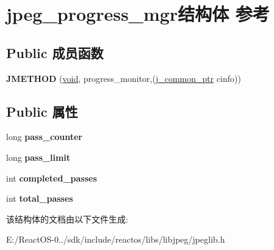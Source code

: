 \hypertarget{structjpeg__progress__mgr}{}\section{jpeg\+\_\+progress\+\_\+mgr结构体 参考}
\label{structjpeg__progress__mgr}
\subsection*{Public 成员函数}
\begin{DoxyCompactItemize}
\item 
\mbox{\label{structjpeg__progress__mgr_aa6fbc36158dd82f586d752f976ad7fa3}} 
{\bfseries J\+M\+E\+T\+H\+OD} (\hyperlink{interfacevoid}{void}, progress\+\_\+monitor,(\hyperlink{structjpeg__common__struct}{j\+\_\+common\+\_\+ptr} cinfo))
\end{DoxyCompactItemize}
\subsection*{Public 属性}
\begin{DoxyCompactItemize}
\item 
\mbox{\label{structjpeg__progress__mgr_ae52d1c89154d3f15ea44f96ee1c4ea7f}} 
long {\bfseries pass\+\_\+counter}
\item 
\mbox{\label{structjpeg__progress__mgr_a68ec6ba74838f7b2b8ded8d4c8254c1d}} 
long {\bfseries pass\+\_\+limit}
\item 
\mbox{\label{structjpeg__progress__mgr_a0cf4c1c84b2662763053e0eeaca417f3}} 
int {\bfseries completed\+\_\+passes}
\item 
\mbox{\label{structjpeg__progress__mgr_a35d61747861f284526a9b312b3dc59ca}} 
int {\bfseries total\+\_\+passes}
\end{DoxyCompactItemize}


该结构体的文档由以下文件生成\+:\begin{DoxyCompactItemize}
\item 
E\+:/\+React\+O\+S-\/0../sdk/include/reactos/libs/libjpeg/jpeglib.\+h\end{DoxyCompactItemize}
